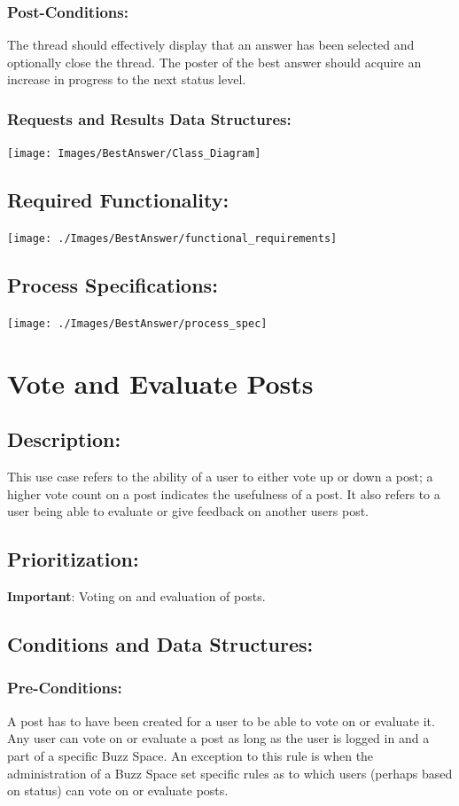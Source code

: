 \documentclass[a4paper,11pt]{article}
\begin{document}
\subsubsection*{Post-Conditions:}
The thread should effectively display that an answer has been selected and optionally close the thread. The poster of the best answer should acquire an increase in progress to the next status level.
\subsubsection*{Requests and Results Data Structures:}
\texttt{[image: Images/BestAnswer/Class\_Diagram]}
\subsection{Required Functionality:} 
\begin{center}
\texttt{[image: ./Images/BestAnswer/functional\_requirements]}
\end{center}
\subsection{Process Specifications:} 
\begin{center}
\texttt{[image: ./Images/BestAnswer/process\_spec]}
\end{center}

\section{Vote and Evaluate Posts}
\subsection*{Description:}
This use case refers to the ability of a user to either vote up or down a post; a higher vote count on a post indicates the usefulness of a post. It also refers to a user being able to evaluate or give feedback on another users post.
\subsection{Prioritization:} 
\textbf{Important}: Voting on and evaluation of posts.
\subsection{Conditions and Data Structures:}
\subsubsection*{Pre-Conditions:}
A post has to have been created for a user to be able to vote on or evaluate it. Any user can vote on or evaluate a post as long as the user is logged in and a part of a specific Buzz Space. An exception to this rule is when the administration of a Buzz Space set specific rules as to which users (perhaps based on status) can vote on or evaluate posts.
\end{document}
